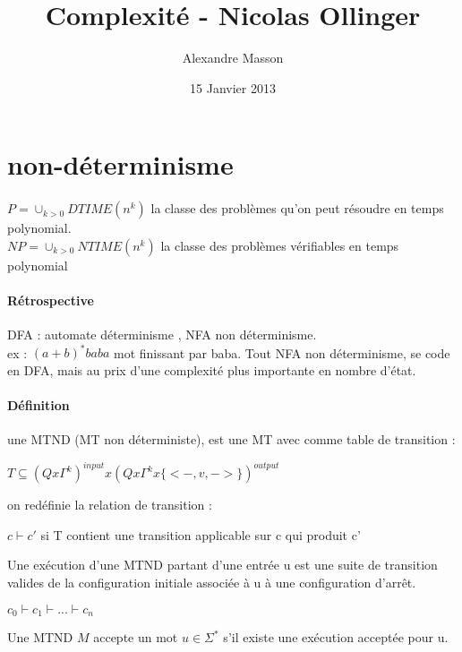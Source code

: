 \documentclass{article}
\title{ Complexité - Nicolas Ollinger}
\author{Alexandre Masson}
\date{15 Janvier 2013}
\begin{document}
\maketitle
\newpage
\tableofcontents
\newpage

\section{non-déterminisme}
\paragraph{} $P = \cup _{k>0} DTIME(n^k)$ la classe des problèmes qu'on peut résoudre en temps polynomial.\\
$NP = \cup _{k>0} NTIME(n^k)$ la classe des problèmes vérifiables en temps polynomial

\paragraph{Rétrospective} DFA : automate déterminisme , NFA non déterminisme.\\
ex :  $(a+b)^*baba$ mot finissant par baba. Tout NFA non déterminisme, se code en DFA, mais au prix d'une complexité plus importante en nombre d'état.
\paragraph{Définition} une MTND (MT non déterministe), est une MT avec comme table de transition : \\
\begin{center}
$T \subseteq (Q x \Gamma^k)^{input} x (Q x \Gamma^k x \{<-, v, ->\})^{output} $\\
\end{center}
on redéfinie la relation de transition : 
\begin{center}
$c \vdash c'$ si T contient une transition applicable sur c qui produit c'\\
\end{center}
Une exécution d'une MTND partant d'une entrée u est une suite de transition valides de la configuration initiale associée à u à une configuration d’arrêt.
\begin{center}
$c_0 \vdash c_1 \vdash ...  \vdash c_n$\\
\end{center}
Une MTND $M$ accepte un mot $u \in \Sigma^*$ s'il existe une exécution acceptée pour u.\\
\end{document}
